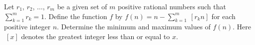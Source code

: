 Let $r_1$,  $r_2$,  $\ldots$,  $r_m$ be a given set of $m$ positive rational numbers such that $\sum_{k=1}^m r_k = 1$.  Define the function $f$ by $f(n)= n-\sum_{k=1}^m \: [r_k n]$ for each positive integer $n$.  Determine the minimum and maximum values of $f(n)$.  Here ${\ [ x ]}$ denotes the greatest integer less than or equal to $x$.